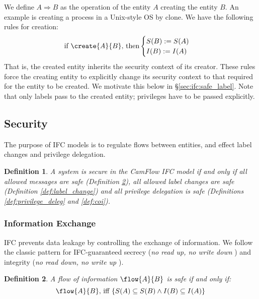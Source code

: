 \documentclass[10pt,journal,compsoc]{IEEEtran}
\newtheorem{definition}{Definition}
\begin{document}
We define $A \Rightarrow B$ as the operation of the entity $A$ creating the entity $B$. An example is creating a process in a Unix-style OS by {\small \textsf{clone}}. We have the following rules for creation:
\begin{equation*}
\text{if }\create{A}{B}\text{, then}\begin{cases}
    S(B) := S(A) \\
    I(B) := I(A)
  \end{cases}
\label{sec:ifc_model:ifc_rule3}
\end{equation*}
That is, the created entity inherits the security context of its creator. These rules force the creating entity to explicitly change its security context to that required for the entity to be created. We motivate this below in \S\ref{sec:ifc:safe_label}.
Note that only labels pass to the created entity; privileges 
have to be passed explicitly.


\subsection{Security}
\label{sec:ifc:security}

The purpose of IFC models is to regulate flows between entities, and effect label changes and privilege delegation.

\begin{definition}
\label{def:safe_system}
A system is secure in the CamFlow IFC model if and only if all allowed messages are safe (Definition \ref{def:safe_message}), all allowed label changes are safe (Definition \ref{def:label_change})  and all privilege delegation is safe (Definitions \ref{def:privilege_deleg} and \ref{def:coi}).
\end{definition}

\subsubsection{Information Exchange}
\label{safemsg}

IFC prevents data leakage by controlling the exchange of information. We follow the classic pattern for IFC-guaranteed secrecy (\emph{no read up, no write down} \cite{bell73}) and integrity (\emph{no read down, no write up} \cite{citeulike:3017234}).

\begin{definition}
\label{def:safe_message}
A flow of information $\flow{A}{B}$ is safe if and only if:
\begin{equation*}
 \flow{A}{B} \text{, iff  }
   \{ S(A) \subseteq S(B) \wedge I(B) \subseteq I(A) \}
\end{equation*}
\end{definition}
\end{document}
